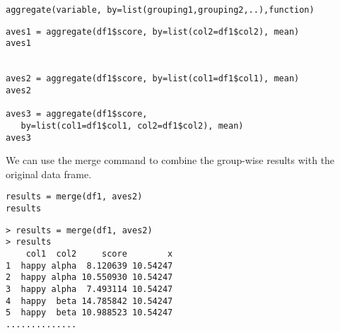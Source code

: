 \documentclass[12pt]{article}
\begin{document}
\begin{verbatim}
aggregate(variable, by=list(grouping1,grouping2,..),function)
\end{verbatim}
\begin{framed}
\begin{verbatim}
aves1 = aggregate(df1$score, by=list(col2=df1$col2), mean)
aves1


aves2 = aggregate(df1$score, by=list(col1=df1$col1), mean)
aves2

aves3 = aggregate(df1$score,
   by=list(col1=df1$col1, col2=df1$col2), mean)
aves3
\end{verbatim}
\end{framed}
We can use the merge command to combine the group-wise results with the original data frame.
\begin{framed}
\begin{verbatim}
results = merge(df1, aves2) 
results
\end{verbatim}
\end{framed}

\begin{verbatim}
> results = merge(df1, aves2) 
> results
    col1  col2     score        x
1  happy alpha  8.120639 10.54247
2  happy alpha 10.550930 10.54247
3  happy alpha  7.493114 10.54247
4  happy  beta 14.785842 10.54247
5  happy  beta 10.988523 10.54247
..............
\end{verbatim}
\newpage
\end{document}
